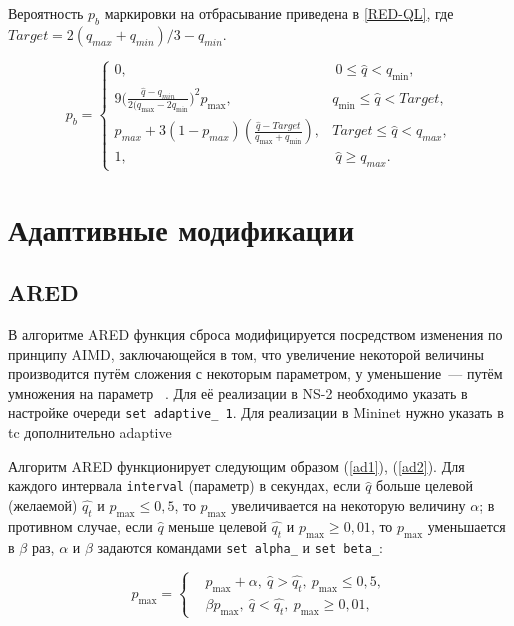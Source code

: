 Вероятность $p_{b}$ маркировки на отбрасывание приведена в \eqref{RED-QL}, где $ Target = 2(q_{max} + q_{min})/3 - q_{min} $.

\begin{equation}
\label{RED-QL}
p_{b} = \begin{cases}
        0, &  \ 0 \leqslant \hat{q} < q_{\min},
        \\
        9({\frac{\hat{q} - q_{min}}{2(q_{\max} - 2q_{\min}})^2} {p_{\max}}, &  q_{\min} \leqslant  \hat{q} < {Target},
        \\
        p_{max} + 3(1-p_{max}) (\frac{\hat{q} - Target}{q_{\max} + q_{\min}}), & {Target} \leqslant  \hat{q} < q_{max},
        \\
        1, &  \ \hat{q} \geqslant q_{max}.
\end{cases}
\end{equation}

\section{Адаптивные модификации}
\label{chap2:sec3}

\subsection{ARED}

В алгоритме ARED функция сброса модифицируется
посредством изменения по принципу AIMD, заключающейся в том, что
увеличение некоторой величины производится путём сложения с некоторым
параметром, у уменьшение~--- путём умножения на
параметр ~\cite{ARED}. Для её реализации в NS-2 необходимо указать в
настройке очереди \verb|set adaptive_ 1|. Для реализации в Mininet нужно указать в tc дополнительно adaptive

Алгоритм ARED функционирует следующим образом (\eqref{ad1}),
(\eqref{ad2}). Для каждого интервала \verb|interval| (параметр) в
секундах, если $\hat{q}$ больше целевой (желаемой) $\hat{q_t}$ и
$p_{\max} \leqslant 0,5$, то $p_{\max}$ увеличивается на некоторую
величину $\alpha$; в противном случае, если $\hat{q}$ меньше целевой
$\hat{q_t}$ и $p_{\max}\geqslant 0,01$, то $p_{\max}$ уменьшается в
$\beta$ раз, $\alpha$ и $\beta$ задаются командами \verb|set alpha_| и \verb|set beta_|:

\begin{equation}
\label{ad1}
p_{\max} = \left\{
  \begin{aligned}
    & p_{\max}+\alpha, \ \hat{q}>\hat{q_{t}}, \ p_{\max} \leqslant 0,5, \\
    & \beta p_{\max}, \ \hat{q}<\hat{q_{t}}, \ p_{\max} \geqslant 0,01, 
  \end{aligned}
\right.
\end{equation}

